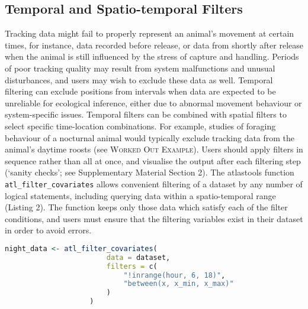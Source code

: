 \begin{refsection}
    \subsection{Temporal and Spatio-temporal Filters}

    Tracking data might fail to properly represent an animal’s movement at certain times, for instance, data recorded before release, or data from shortly after release when the animal is still influenced by the stress of capture and handling.
    Periods of poor tracking quality may result from system malfunctions and unusual disturbances, and users may wish to exclude these data as well.
    Temporal filtering can exclude positions from intervals when data are expected to be unreliable for ecological inference, either due to abnormal movement behaviour or system-specific issues.  
    Temporal filters can be combined with spatial filters to select specific time-location combinations. 
    For example, studies of foraging behaviour of a nocturnal animal would typically exclude tracking data from the animal's daytime roosts (see \textsc{Worked Out Example}).
    Users should apply filters in sequence rather than all at once, and visualise the output after each filtering step (`sanity checks'; see Supplementary Material Section 2).
    The atlastools function \texttt{atl\_filter\_covariates} allows convenient filtering of a dataset by any number of logical statements, including querying data within a spatio-temporal range (Listing 2).
    The function keeps only those data which satisfy each of the filter conditions, and users must ensure that the filtering variables exist in their dataset in order to avoid errors.

    \begin{lstlisting}[float, language=R, style=customR, caption = {
        Data can be filtered by a temporal or a spatio-temporal range using \texttt{atl\_filter\_covariates}. 
        Filter conditions are passed to the \texttt{filters} argument as a character vector. 
        Only rows in the data satisfying \textit{all} the conditions are retained. 
        Here, the first example shows how nighttime data can be retained using a predicate that determines whether the value of `hour' is between 6 and 18, and also within a range of X coordinates.
        The second example retains ATLAS locations calculated using $>$ 3 base stations (\texttt{NBS}), with location error (\texttt{SD}) $<$ 100, and data between an arbitrary day 5 and day 8.
        }]
    night_data <- atl_filter_covariates(
                        data = dataset,
                        filters = c(
                            "!inrange(hour, 6, 18)",
                            "between(x, x_min, x_max)"
                        )
                    )


\end{lstlisting}
\end{refsection}
